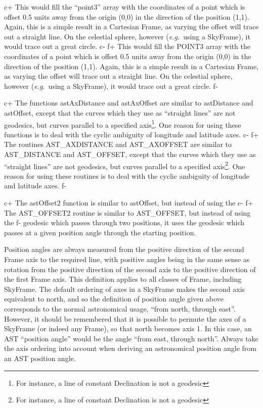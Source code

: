 \documentclass[twoside,11pt]{article}
\begin{document}
c+
This would fill the ``point3'' array with the coordinates of a point
which is offset 0.5 units away from the origin (0,0) in the direction
of the position (1,1). Again, this is a simple result in a Cartesian
Frame, as varying the offset will trace out a straight line. On the
celestial sphere, however ({\em{e.g.}}\ using a SkyFrame), it would
trace out a great circle.
c-
f+
This would fill the POINT3 array with the coordinates of a point which
is offset 0.5 units away from the origin (0,0) in the direction of the
position (1,1). Again, this is a simple result in a Cartesian Frame,
as varying the offset will trace out a straight line. On the celestial
sphere, however ({\em{e.g.}}\ using a SkyFrame), it would trace out a
great circle.
f-

c+
The functions astAxDistance and astAxOffset are similar to astDistance
and astOffset, except that the curves which they use as ``straight
lines'' are not geodesics, but curves parallel to a specified axis\footnote
{For instance, a line of constant Declination is not a geodesic}. One
reason for using these functions is to deal with the cyclic ambiguity of
longitude and latitude axes.
c-
f+
The routines AST\_AXDISTANCE and AST\_AXOFFSET are similar to AST\_DISTANCE
and AST\_OFFSET, except that the curves which they use as ``straight
lines'' are not geodesics, but curves parallel to a specified axis\footnote
{For instance, a line of constant Declination is not a geodesic}. One
reason for using these routines is to deal with the cyclic ambiguity of
longitude and latitude axes.
f-

c+
The astOffset2 function is similar to astOffset, but instead of using the
c-
f+
The AST\_OFFSET2 routine is similar to AST\_OFFSET, but instead of using the
f-
geodesic which passes through two positions, it uses the geodesic which
passes at a given position angle through the starting position. 

Position angles are always measured from the positive direction of the 
second Frame axis to the required line, with positive angles being in the 
same sense as rotation from the positive direction of the second axis to 
the positive direction of the first Frame axis. This definition applies
to all classes of Frame, including SkyFrame. The default ordering of axes
in a SkyFrame makes the second axis equivalent to north, and so the
definition of position angle given above corresponds to the normal 
astronomical usage, ``from north, through east''. However, it should be
remembered that it is possible to permute the axes of a SkyFrame (or
indeed any Frame), so that north becomes axis 1. In this case, an AST
``position angle'' would be the angle ``from east, through north''. 
Always take the axis ordering into account when deriving an astronomical 
position angle from an AST position angle.
\end{document}
